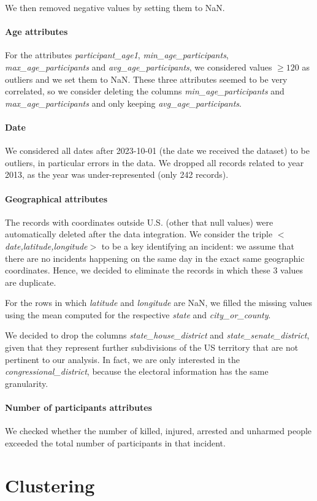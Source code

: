 \documentclass[10pt,a4paper]{report}
\begin{document}
We then removed negative values by setting them to NaN.

\subsubsection{Age attributes}

For the attributes \textit{participant\_age1}, \textit{min\_age\_participants}, \textit{max\_age\_participants} and \textit{avg\_age\_participants}, we considered values $\ge 120$ as outliers and we set them to NaN.
These three attributes seemed to be very correlated, so we consider deleting the columns \textit{min\_age\_participants} and \textit{max\_age\_participants} and only keeping \textit{avg\_age\_participants}.

\subsubsection{Date}

We considered all dates after 2023-10-01 (the date we received the dataset) to be outliers, in particular errors in the data.
We dropped all records related to year 2013, as the year was under-represented (only 242 records).

\subsubsection{Geographical attributes}

The records with coordinates outside U.S. (other that null values) were automatically deleted after the data integration.
We consider the triple \textit{$<$date,latitude,longitude$>$} to be a key identifying an incident: we assume that there are no incidents happening on the same day in the exact same geographic coordinates.
Hence, we decided to eliminate the records in which these 3 values are duplicate.

For the rows in which \textit{latitude} and \textit{longitude} are NaN, we filled the missing values using the mean computed for the respective \textit{state} and \textit{city\_or\_county}.

We decided to drop the columns \textit{state\_house\_district} and \textit{state\_senate\_district}, given that they represent further subdivisions of the US territory that are not pertinent to our analysis.
In fact, we are only interested in the \textit{congressional\_district}, because the electoral information has the same granularity.

\subsubsection{Number of participants attributes}

We checked whether the number of killed, injured, arrested and unharmed people exceeded the total number of participants in that incident.

\chapter{Clustering}
\end{document}
